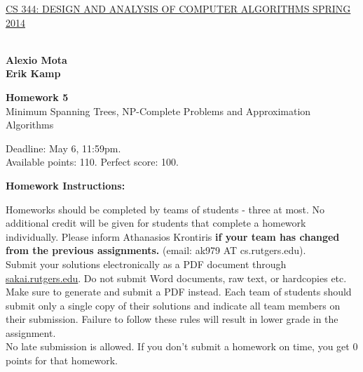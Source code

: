 \documentclass{article}
\begin{document}
\sloppy

\noindent \underline{CS 344: DESIGN AND ANALYSIS OF COMPUTER
  ALGORITHMS \hspace{1.6in} SPRING 2014}

\vspace{0.1in}

\\
{\bf {\large Alexio Mota}}\\
{\bf {\large Erik Kamp}}\\

\vspace{0.1in}

\begin{center}
{\bf {\large Homework 5}}\\
Minimum Spanning Trees, NP-Complete Problems and Approximation Algorithms\\
\end{center}

\vspace{0.1in}

\noindent Deadline: May 6, 11:59pm.\\ 
Available points: 110. Perfect score: 100.\\

\begin{center}
{\bf Homework Instructions:}
\end{center}

 Homeworks should be completed by teams of
students - three at most. No additional credit will be given for
students that complete a homework individually. Please inform
Athanasios Krontiris {\bf if your team has changed from the previous
  assignments.} (email: ak979 AT cs.rutgers.edu).\\

 Submit your solutions electronically
as a PDF document through \url{sakai.rutgers.edu}. Do not submit Word
documents, raw text, or hardcopies etc. Make sure to generate and
submit a PDF instead. Each team of students should submit only a
single copy of their solutions and indicate all team members on their
submission.  Failure to follow these rules will result in lower grade
in the assignment.\\

 No late submission is allowed. If
you don't submit a homework on time, you get 0 points for that
homework.\\
\end{document}
